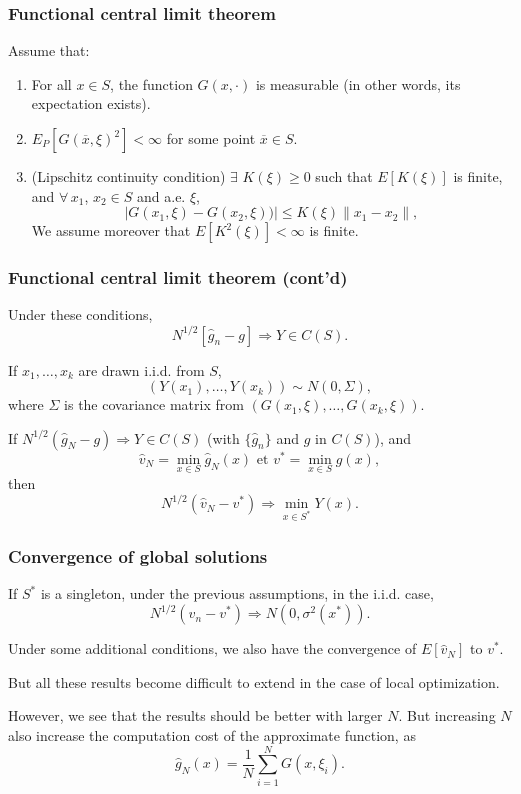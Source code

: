 \documentclass{beamer}
\begin{document}
\begin{frame}
\frametitle{Functional central limit theorem}

Assume that:
\begin{enumerate}
\item
For all $x \in S$, the function $G(x,\cdot)$ is measurable (in other words, its expectation exists).
\item
$E_P[G(\overline{x}, \xi)^2] < \infty$ for some point $\overline{x} \in S$.
\item
(Lipschitz continuity condition) 
$\exists$ $K(\xi) \geq 0$ such that $E[K(\xi)]$ is finite, and
$\forall\, x_1$, $x_2 \in S$ and a.e. $\xi$,
\[
| G(x_1, \xi) - G(x_2, \xi) )| \leq K(\xi) \| x_1 - x_2\|,
\]
We assume moreover that $E[K^2(\xi)] < \infty$ is finite.
\end{enumerate}

\end{frame}

\begin{frame}
\frametitle{Functional central limit theorem (cont'd)}

Under these conditions,
\[
N^{1/2} [\hat{g}_n - g] \Rightarrow Y \in C(S).
\]

\mbox{}

If $x_1,\ldots,x_k$ are drawn i.i.d. from $S$, %
$$
(Y(x_1),\ldots,Y(x_k)) \sim N(0, \Sigma),
$$
where $\Sigma$ is the covariance matrix from $(G(x_1, \xi), \ldots, G(x_k, \xi))$.

\mbox{}

If $N^{1/2}(\hat{g}_N - g) \Rightarrow Y \in C(S)$ (with $\lbrace \hat{g}_n \rbrace$ and $g$ in $C(S)$), and
\[
\hat{v}_N = \min_{x \in S} \hat{g}_N(x) \mbox{ et } v^*= \min_{x \in S} g(x),
\]
then
\[
N^{1/2}(\hat{v}_N - v^*) \Rightarrow \min_{x \in S^*} Y(x).
\]

\end{frame}

\begin{frame}
\frametitle{Convergence of global solutions}

If $S^*$ is a singleton, under the previous assumptions, in the i.i.d. case,
\[
N^{1/2}(\hat{v}_n - v^*) \Rightarrow N(0, \sigma^2(x^*) ).
\]

\mbox{}

Under some additional conditions, we also have the convergence of $E[\hat{v}_N]$ to $v^*$.

\mbox{}

But all these results become difficult to extend in the case of local optimization.

\mbox{}

However, we see that the results should be better with larger $N$.
But increasing $N$ also increase the computation cost of the approximate function, as\[
\hat{g}_N(x) = \frac{1}{N} \sum_{i = 1}^N G (x, \xi_i).
\]

\end{frame}
\end{document}
